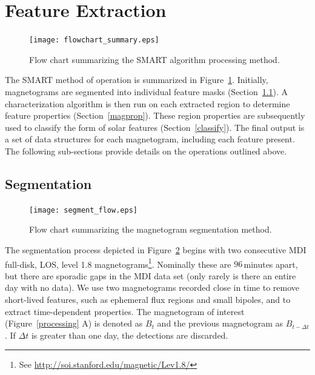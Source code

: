 \section{Feature Extraction}\label{algorithm}

\begin{figure}[!t]
\centerline{\texttt{[image: flowchart\_summary.eps]}}
\caption[The SMART method.]{Flow chart summarizing the SMART algorithm processing method.}
\label{flowsummary}
\end{figure}

The \gls{SMART} method of operation is summarized in Figure~\ref{flowsummary}. Initially, magnetograms are segmented into individual feature masks (Section~\ref{dataproc}). A characterization algorithm is then run on each extracted region to determine feature properties (Section~\ref{magprop}). These region properties are subsequently used to classify the form of solar features (Section~\ref{classify}).
The final output is a set of data structures for each magnetogram, including each feature present. The following sub-sections provide details on the operations outlined above.

\subsection{Segmentation}\label{dataproc}

\begin{figure}[!t]
\centerline{\texttt{[image: segment\_flow.eps]}}
\caption[The SMART segmentation method.]{Flow chart summarizing the magnetogram segmentation method.}
\label{segment}
\end{figure}

The segmentation process depicted in Figure~\ref{segment} begins with two consecutive \gls{MDI} full-disk, \gls{LOS}, level 1.8 magnetograms\footnote{See \url{http://soi.stanford.edu/magnetic/Lev1.8/}}. 
Nominally these are $96$\,minutes apart, but there are sporadic gaps in the MDI data set (only rarely is there an entire day with no data). We use two magnetograms recorded close in time to remove short-lived features, such as ephemeral flux regions and small bipoles, and to extract time-dependent properties. The magnetogram of interest (Figure~\ref{processing} A) is denoted as $B_{t}$ and the previous magnetogram as $B_{t-\Delta t}$. If $\Delta t$ is greater than one day, the detections are discarded.

